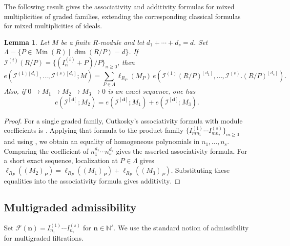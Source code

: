 \documentclass[reqno,12pt]{amsart}
\theoremstyle{plain}
\newtheorem{lem}[prop]{Lemma}
\theoremstyle{definition}
\theoremstyle{remark}
\newcommand{\N}{\mathbb N}
\DeclareMathOperator{\Min}{Min}
\numberwithin{equation}{section}
\begin{document}
The following result gives the associativity and additivity formulas for
mixed multiplicities of graded families, extending the corresponding
classical formulas for mixed multiplicities of ideals. 
\begin{lem}
\label{lem:assoc-add}
Let $M$ be a finite $R$-module and let $d_1+\cdots+d_s=d$. Set
$\Lambda=\{P\in\Min(R)\mid\dim(R/P)=d\}$. If $\mathcal I^{(i)}(R/P)=\{(I_n^{(i)}+P)/P\}_{n\geq0}$, then
\[
e\!\left(\mathcal I^{(1)[d_1]},\ldots,\mathcal I^{(s)[d_s]};M\right)
=
\sum_{P\in\Lambda}\ell_{R_P}(M_P)\,
e\!\left(\mathcal I^{(1)}(R/P)^{[d_1]},\ldots,\mathcal I^{(s)}.(R/P)^{[d_s]}\right).
\]
Also, if $0\to M_1\to M_2\to M_3\to0$ is an exact sequence, one has
\[
e(\boldsymbol{\mathcal I}^{[\mathbf d]};M_2)
=
e(\boldsymbol{\mathcal I}^{[\mathbf d]};M_1)
+
e(\boldsymbol{\mathcal I}^{[\mathbf d]};M_3).
\]
\end{lem}

\begin{proof}
For a single graded family, Cutkosky's associativity formula with module
coefficients is \cite[Corollary~3.2]{Cutkosky2026}. Applying that formula
to the product family
$\{I_{mn_1}^{(1)}\cdots I_{mn_s}^{(s)}\}_{m\geq0}$ and using
\cite[Theorem~3.4]{Cutkosky2026}, we obtain an equality of homogeneous
polynomials in $n_1,\ldots,n_s$. Comparing the coefficient of
$n_1^{d_1}\cdots n_s^{d_s}$ gives the asserted associativity formula.
For a short exact sequence, localization at $P\in\Lambda$ gives $\ell_{R_P}((M_2)_P)=
\ell_{R_P}((M_1)_P)+\ell_{R_P}((M_3)_P).$
Substituting these equalities into the associativity formula gives
additivity.
\end{proof}

\subsection*{Multigraded admissibility}

Set $\mathcal F(\mathbf n)=I_{n_1}^{(1)}\cdots I_{n_s}^{(s)}$ for
$\mathbf n\in\N^s$. We use the standard notion of admissibility for
multigraded filtrations.
\end{document}
